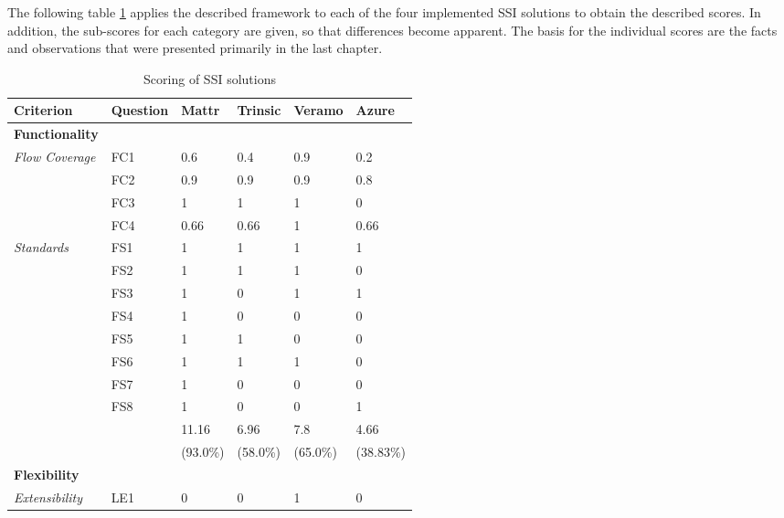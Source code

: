     The following table \ref{tab: scores} applies the described framework to each of the four implemented \ac{SSI} solutions to obtain the described scores. In addition, the sub-scores for each category are given, so that differences become apparent. The basis for the individual scores are the facts and observations that were presented primarily in the last chapter. 

    \setlength\LTleft{0pt}
    \setlength\LTright{0pt}
    \begin{longtable}{@{\extracolsep{\fill}}llllll@{}}
        \caption{Scoring of \acs{SSI} solutions}
        \label{tab: scores}\\
        \toprule
        \textbf{Criterion}     & \textbf{Question} & \textbf{Mattr} & \textbf{Trinsic} & \textbf{Veramo} & \textbf{Azure} \\ \midrule
        \endfirsthead\endhead\endfoot\endlastfoot
        \textbf{Functionality} &&&&&\\
        \textit{Flow Coverage} & FC1 & 0.6 & 0.4 & 0.9 & 0.2 \\
                               & FC2 & 0.9 & 0.9 & 0.9 & 0.8 \\
                               & FC3 & 1 & 1 & 1 & 0 \\
                               & FC4 & 0.66 & 0.66 & 1 & 0.66 \\
        \textit{Standards}     & FS1 & 1 & 1 & 1 & 1 \\
                               & FS2 & 1 & 1 & 1 & 0 \\
                               & FS3 & 1 & 0 & 1 & 1 \\
                               & FS4 & 1 & 0 & 0 & 0 \\
                               & FS5 & 1 & 1 & 0 & 0 \\
                               & FS6 & 1 & 1 & 1 & 0 \\
                               & FS7 & 1 & 0 & 0 & 0 \\
                               & FS8 & 1 & 0 & 0 & 1 \\
                               \hline
                               && 11.16 & 6.96 & 7.8 & 4.66\\
                               && (93.0\%) & (58.0\%) & (65.0\%) & (38.83\%) \\                               
                               \midrule
        \textbf{Flexibility} &&&&&\\
        \textit{Extensibility} & LE1 & 0 & 0 & 1 & 0 \\

\end{longtable}
